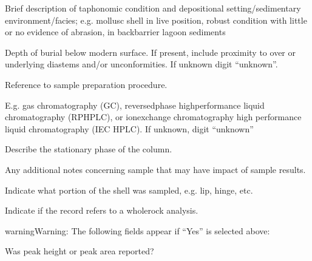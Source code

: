 \documentclass[letterpaper,10pt,english]{sphinxmanual}
\begin{document}
 \sphinxhyphen{} Brief description of taphonomic condition and depositional setting/sedimentary environment/facies; e.g. mollusc shell in live position, robust condition with little or no evidence of abrasion, in back\sphinxhyphen{}barrier lagoon sediments

 \sphinxhyphen{} Depth of burial below modern surface. If present, include proximity to over\sphinxhyphen{} or underlying diastems and/or unconformities. If unknown digit “unknown”.

 \sphinxhyphen{} Reference to sample preparation procedure.

 \sphinxhyphen{} E.g. gas chromatography (GC), reversed\sphinxhyphen{}phase high\sphinxhyphen{}performance liquid chromatography (RP\sphinxhyphen{}HPLC), or ion\sphinxhyphen{}exchange chromatography high performance liquid chromatography (IEC HPLC). If unknown, digit “unknown”

 \sphinxhyphen{} Describe the stationary phase of the column.

 \sphinxhyphen{} Any additional notes concerning sample that may have impact of sample results.

 \sphinxhyphen{} Indicate what portion of the shell was sampled, e.g. lip, hinge, etc.

 \sphinxhyphen{} Indicate if the record refers to a whole\sphinxhyphen{}rock analysis.

\begin{sphinxadmonition}{warning}{Warning:}
The following fields appear if “Yes” is selected above:



\end{sphinxadmonition}



 \sphinxhyphen{} Was peak height or peak area reported?
\end{document}
